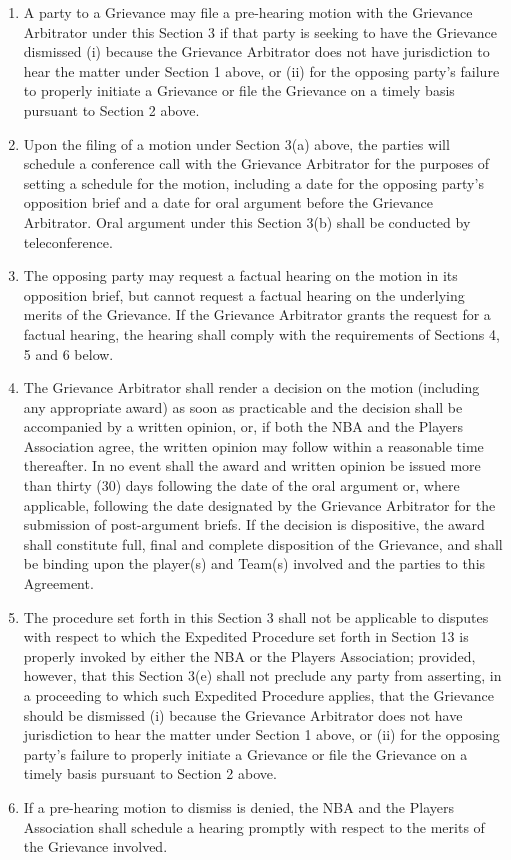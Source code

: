 \documentclass[
]{book}
\providecommand{\tightlist}{%
  \setlength{\itemsep}{0pt}\setlength{\parskip}{0pt}}
\begin{document}
\begin{enumerate}
\def\labelenumi{(\alph{enumi})}
\tightlist
\item
  A party to a Grievance may file a pre-hearing motion with the Grievance Arbitrator under this Section 3 if that party is seeking to have the Grievance dismissed (i) because the Grievance Arbitrator does not have jurisdiction to hear the matter under Section 1 above, or (ii) for the opposing party's failure to properly initiate a Grievance or file the Grievance on a timely basis pursuant to Section 2 above.
\item
  Upon the filing of a motion under Section 3(a) above, the parties will schedule a conference call with the Grievance Arbitrator for the purposes of setting a schedule for the motion, including a date for the opposing party's opposition brief and a date for oral argument before the Grievance Arbitrator. Oral argument under this Section 3(b) shall be conducted by teleconference.
\item
  The opposing party may request a factual hearing on the motion in its opposition brief, but cannot request a factual hearing on the underlying merits of the Grievance. If the Grievance Arbitrator grants the request for a factual hearing, the hearing shall comply with the requirements of Sections 4, 5 and 6 below.
\item
  The Grievance Arbitrator shall render a decision on the motion (including any appropriate award) as soon as practicable and the decision shall be accompanied by a written opinion, or, if both the NBA and the Players Association agree, the written opinion may follow within a reasonable time thereafter. In no event shall the award and written opinion be issued more than thirty (30) days following the date of the oral argument or, where applicable, following the date designated by the Grievance Arbitrator for the submission of post-argument briefs. If the decision is dispositive, the award shall constitute full, final and complete disposition of the Grievance, and shall be binding upon the player(s) and Team(s) involved and the parties to this Agreement.
\item
  The procedure set forth in this Section 3 shall not be applicable to disputes with respect to which the Expedited Procedure set forth in Section 13 is properly invoked by either the NBA or the Players Association; provided, however, that this Section 3(e) shall not preclude any party from asserting, in a proceeding to which such Expedited Procedure applies, that the Grievance should be dismissed (i) because the Grievance Arbitrator does not have jurisdiction to hear the matter under Section 1 above, or (ii) for the opposing party's failure to properly initiate a Grievance or file the Grievance on a timely basis pursuant to Section 2 above.
\item
  If a pre-hearing motion to dismiss is denied, the NBA and the Players Association shall schedule a hearing promptly with respect to the merits of the Grievance involved.
\end{enumerate}
\end{document}
